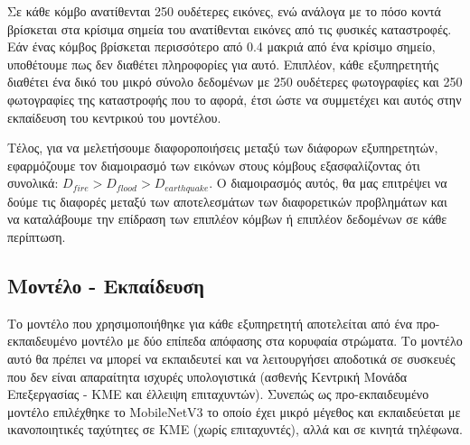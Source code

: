 \newpage

Σε κάθε κόμβο ανατίθενται 250 ουδέτερες εικόνες, ενώ ανάλογα με το πόσο κοντά βρίσκεται στα κρίσιμα σημεία του ανατίθενται εικόνες από τις φυσικές καταστροφές. Εάν ένας κόμβος βρίσκεται περισσότερο από 0.4 μακριά από ένα κρίσιμο σημείο, υποθέτουμε πως δεν διαθέτει πληροφορίες για αυτό. Επιπλέον, κάθε εξυπηρετητής διαθέτει ένα δικό του μικρό σύνολο δεδομένων με 250 ουδέτερες φωτογραφίες και 250 φωτογραφίες της καταστροφής που το αφορά, έτσι ώστε να συμμετέχει και αυτός στην εκπαίδευση του κεντρικού του μοντέλου.

Τέλος, για να μελετήσουμε διαφοροποιήσεις μεταξύ των διάφορων εξυπηρετητών, εφαρμόζουμε τον διαμοιρασμό των εικόνων στους κόμβους εξασφαλίζοντας ότι συνολικά: $D_{fire} > D_{flood} > D_{earthquake}$. Ο διαμοιρασμός αυτός, θα μας επιτρέψει να δούμε τις διαφορές μεταξύ των αποτελεσμάτων των διαφορετικών προβλημάτων και να καταλάβουμε την επίδραση των επιπλέον κόμβων ή επιπλέον δεδομένων σε κάθε περίπτωση.

\subsection{Μοντέλο - Εκπαίδευση}

Το μοντέλο που χρησιμοποιήθηκε για κάθε εξυπηρετητή αποτελείται από ένα προ-εκπαιδευμένο μοντέλο με δύο επίπεδα απόφασης στα κορυφαία στρώματα. Το μοντέλο αυτό θα πρέπει να μπορεί να εκπαιδευτεί και να λειτουργήσει αποδοτικά σε συσκευές που δεν είναι απαραίτητα ισχυρές υπολογιστικά (ασθενής Κεντρική Μονάδα Επεξεργασίας - ΚΜΕ και έλλειψη επιταχυντών). Συνεπώς ως προ-εκπαιδευμένο μοντέλο επιλέχθηκε το MobileNetV3 το οποίο έχει μικρό μέγεθος και εκπαιδεύεται με ικανοποιητικές ταχύτητες σε ΚΜΕ (χωρίς επιταχυντές), αλλά και σε κινητά τηλέφωνα.

